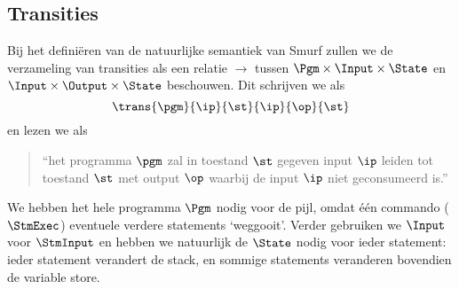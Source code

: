 \subsection{Transities}
\label{sec:def:trans}

Bij het definiëren van de natuurlijke semantiek van Smurf zullen we de
verzameling van transities als een relatie $\to$ tussen
$\Pgm\times\Input\times\State$ en $\Input\times\Output\times\State$ beschouwen.
Dit schrijven we als
$$\trans{\pgm}{\ip}{\st}{\ip}{\op}{\st}$$
en lezen we als
\begin{quote}
	``het programma $\pgm$ zal in toestand $\st$ gegeven input $\ip$ leiden tot
	toestand $\st$ met output $\op$ waarbij de input $\ip$ niet geconsumeerd is.''
\end{quote}

We hebben het hele programma $\Pgm$ nodig voor de pijl, omdat één commando
($\StmExec$) eventuele verdere statements `weggooit'. %
Verder gebruiken we $\Input$ voor $\StmInput$ en hebben we natuurlijk de
$\State$ nodig voor ieder statement: ieder statement verandert de stack, en
sommige statements veranderen bovendien de variable store.

